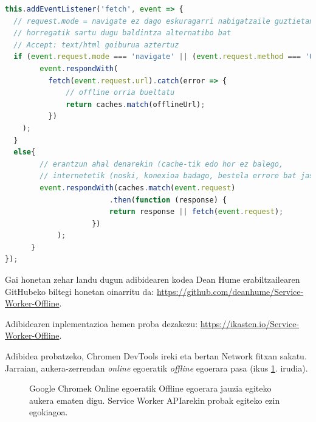 \begin{lstlisting}[language=JavaScript]
this.addEventListener('fetch', event => {
  // request.mode = navigate ez dago eskuragarri nabigatzaile guztietan
  // horregatik sartu dugu baldintza alternatibo bat
  // Accept: text/html goiburua aztertuz
  if (event.request.mode === 'navigate' || (event.request.method === 'GET' && event.request.headers.get('accept'). includes('text/html'))) {
        event.respondWith(
          fetch(event.request.url).catch(error => {
              // offline orria bueltatu
              return caches.match(offlineUrl);
          })
    );
  }
  else{
        // erantzun ahal denarekin (cache-tik edo hor ez balego,
        // internetetik (noski, konexioa badago, bestela errore bat jasoko dugu)
        event.respondWith(caches.match(event.request)
                        .then(function (response) {
                        return response || fetch(event.request);
                    })
            );
      }
});
\end{lstlisting}

Gai honetan zehar landu dugun adibidearen kodea Dean Hume erabiltzailearen GitHubeko biltegi honetan oinarritu da: 
\href{https://github.com/deanhume/Service-Worker-Offline}{https://github.com/deanhume/Service-Worker-Offline}.

Adibidearen inplementazioa hemen proba dezakezu: \href{https://ikasten.io/Service-Worker-Offline/}{https://ikasten.io/Service-Worker-Offline}.


Adibidea probatzeko, Chromen DevTools ireki eta bertan Network fitxan sakatu. Jarraian, aukera-zerrendan \textit{online} egoeratik \textit{offline} egoerara pasa (ikus \ref{fig:serviceworker6}. irudia).
\begin{figure}[ht]
	\centering
{}
\caption{Google Chromek Online egoeratik Offline egoerara jauzia egiteko aukera ematen digu. Service Worker APIarekin probak egiteko ezin egokiagoa.}
\label{fig:serviceworker6}
\end{figure}

